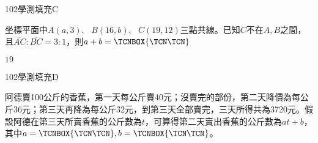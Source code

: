 \begin{QUESTIONS}
\begin{QUESTION}
\begin{QEMPTYSPACE}
        \end{QEMPTYSPACE}
    \end{QUESTION}
    \begin{QUESTION}
        \begin{ExamInfo}{102}{學測}{填充}{C}
        \end{ExamInfo}
        \begin{ExamAnsRateInfo}{64}{94}{74}{24}
        \end{ExamAnsRateInfo}
        \begin{QBODY}
            坐標平面中$A(a,3),\text{ }B(16,b),\text{ }C(19,12)$三點共線。已知$C$不在$A,B$之間，且$\overline{AC}:\overline{BC}=3:1$，則$a+b=\TCNBOX{\TCN\TCN}$
        \end{QBODY}
        \begin{QFROMS}
        \end{QFROMS}
        \begin{QTAGS}\end{QTAGS}
        \begin{QANS}
            $19$
        \end{QANS}
        \begin{QSOLLIST}
        \end{QSOLLIST}
        \begin{QEMPTYSPACE}
        \end{QEMPTYSPACE}
    \end{QUESTION}
    \begin{QUESTION}
        \begin{ExamInfo}{102}{學測}{填充}{D}
        \end{ExamInfo}
        \begin{ExamAnsRateInfo}{23}{53}{15}{1}
        \end{ExamAnsRateInfo}
        \begin{QBODY}
            阿德賣100公斤的香蕉，第一天每公斤賣40元；沒賣完的部份，第二天降價為每公斤36元；第三天再降為每公斤32元，到第三天全部賣完，三天所得共為3720元。假設阿德在第三天所賣香蕉的公斤數為$t$，可算得第二天賣出香蕉的公斤數為$at+b$，其中$a= \TCNBOX{\TCN\TCN}, b= \TCNBOX{\TCN\TCN}$。
        \end{QBODY}
        \begin{QFROMS}
        \end{QFROMS}
        \begin{QTAGS}\end{QTAGS}

\end{QUESTION}
\end{QUESTIONS}
